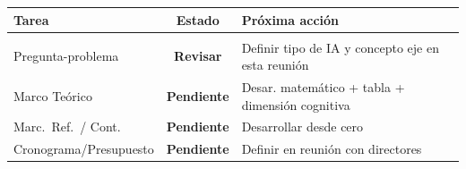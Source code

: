 \documentclass[11pt, aspectratio=169, spanish]{beamer}
\begin{document}
\begin{frame}[plain, shrink=22]
\vspace{0.04cm}

\begin{tcolorbox}[colback=GrisFondo, colframe=GrisClaro, arc=2mm]
{\scriptsize
\begin{tabular}{p{3.5cm}cp{6.5cm}}
\textbf{Tarea} & \textbf{Estado} & \textbf{Próxima acción} \\[2pt]
\hline\\[-6pt]
Pregunta-problema     & \textcolor{RojoAlerta}{\textbf{Revisar}}    & Definir tipo de IA y concepto eje en esta reunión \\[2pt]
Marco Teórico         & \textcolor{NaranjaPend}{\textbf{Pendiente}} & Desar. matemático + tabla + dimensión cognitiva \\[2pt]
Marc.\ Ref.\ / Cont.\ & \textcolor{NaranjaPend}{\textbf{Pendiente}} & Desarrollar desde cero \\[2pt]
Cronograma/Presupuesto & \textcolor{NaranjaPend}{\textbf{Pendiente}} & Definir en reunión con directores \\
\end{tabular}}
\end{tcolorbox}
\end{frame}
\end{document}
